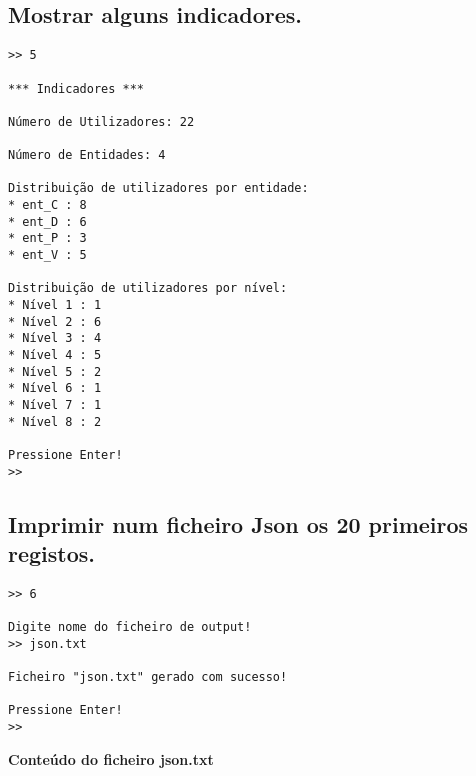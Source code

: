 \documentclass[11pt,a4paper]{report}%
\begin{document}
\subsection{Mostrar alguns indicadores.}

\begin{verbatim}
>> 5

*** Indicadores ***

Número de Utilizadores: 22

Número de Entidades: 4

Distribuição de utilizadores por entidade:
* ent_C : 8
* ent_D : 6
* ent_P : 3
* ent_V : 5

Distribuição de utilizadores por nível:
* Nível 1 : 1
* Nível 2 : 6
* Nível 3 : 4
* Nível 4 : 5
* Nível 5 : 2
* Nível 6 : 1
* Nível 7 : 1
* Nível 8 : 2

Pressione Enter!
>> 
\end{verbatim}



\subsection{Imprimir num ficheiro Json os 20 primeiros registos.}

\begin{verbatim}
>> 6

Digite nome do ficheiro de output!
>> json.txt

Ficheiro "json.txt" gerado com sucesso!

Pressione Enter!
>> 
\end{verbatim}

\textbf{Conteúdo do ficheiro json.txt}
\end{document}
